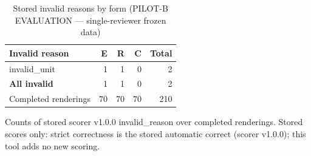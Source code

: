 \begin{table}[t]
\centering
\small
\caption{Stored invalid reasons by form (PILOT-B EVALUATION --- single-reviewer frozen data)}
\label{tab:pilotb-Qwen3-8B-invalid}
\begin{tabular}{lrrrr}
\toprule
Invalid reason & E & R & C & Total \\
\midrule
invalid\_unit & 1 & 1 & 0 & 2 \\
\textbf{All invalid} & 1 & 1 & 0 & 2 \\
Completed renderings & 70 & 70 & 70 & 210 \\
\bottomrule
\end{tabular}
\par\smallskip
\parbox{\linewidth}{\footnotesize Counts of stored scorer v1.0.0 invalid\_reason over completed renderings. Stored scores only: strict correctness is the stored automatic correct (scorer v1.0.0); this tool adds no new scoring.}
\end{table}
